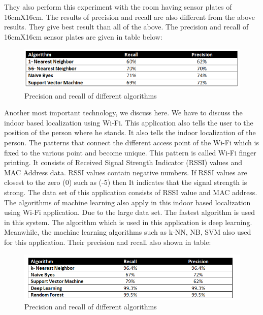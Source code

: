 They also perform this experiment with the room having sensor plates of 16cmX16cm. The results of precision and recall are also different from the above results. They give best result than all of the above. The precision and recall of 16cmX16cm sensor plates are given in table below:  

\begin{figure}[h]
  		\centering
    		\includegraphics[scale=0.9]{./Figures/pr3}
\caption{Precision and recall of different algorithms}
\label{fig:5}
 		\end{figure}
Another most important technology, we discuss here. We have to discuss the indoor based localization using Wi-Fi. This application also tells the user to the position of the person where he stands. It also tells the indoor localization of the person. The patterns that connect the different access point of the Wi-Fi which is fixed to the various point and become unique. This pattern is called Wi-Fi finger printing. It consists of Received Signal Strength Indicator (RSSI) values and MAC Address data. RSSI values contain negative numbers. If RSSI values are closest to the zero (0) such as (-5) then It indicates that the signal strength is strong. 
The data set of this application consists of RSSI value and MAC address. The algorithms of machine learning also apply in this indoor based localization using Wi-Fi application. Due to the large data set. The fastest algorithm is used in this system. The algorithm which is used in this application is deep learning. Meanwhile, the machine learning algorithms such as k-NN, NB, SVM also used for this application. Their precision and recall also shown in table:

\begin{figure}[h]
  		\centering
    		\includegraphics[scale=0.7]{./Figures/pr4}
\caption{Precision and recall of different algorithms}
\label{fig:6}
 		\end{figure}


